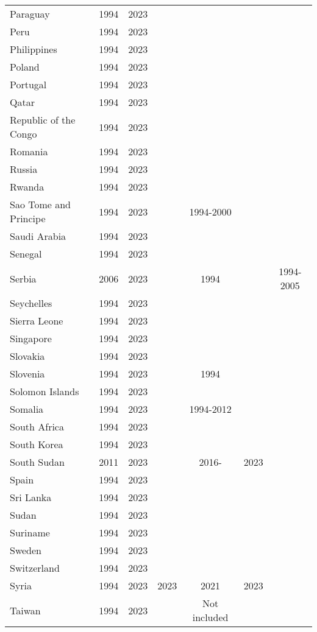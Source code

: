 {\begin{longtable}{lcccccc}
Paraguay & 1994 & 2023 &  &  &  & \\
\addlinespace
Peru & 1994 & 2023 &  &  &  & \\
Philippines & 1994 & 2023 &  &  &  & \\
Poland & 1994 & 2023 &  &  &  & \\
Portugal & 1994 & 2023 &  &  &  & \\
Qatar & 1994 & 2023 &  &  &  & \\
\addlinespace
Republic of the Congo & 1994 & 2023 &  &  &  & \\
Romania & 1994 & 2023 &  &  &  & \\
Russia & 1994 & 2023 &  &  &  & \\
Rwanda & 1994 & 2023 &  &  &  & \\
Sao Tome and Principe & 1994 & 2023 &  & 1994-2000 &  & \\
\addlinespace
Saudi Arabia & 1994 & 2023 &  &  &  & \\
Senegal & 1994 & 2023 &  &  &  & \\
Serbia & 2006 & 2023 &  & 1994 &  & 1994-2005\\
Seychelles & 1994 & 2023 &  &  &  & \\
Sierra Leone & 1994 & 2023 &  &  &  & \\
\addlinespace
Singapore & 1994 & 2023 &  &  &  & \\
Slovakia & 1994 & 2023 &  &  &  & \\
Slovenia & 1994 & 2023 &  & 1994 &  & \\
Solomon Islands & 1994 & 2023 &  &  &  & \\
Somalia & 1994 & 2023 &  & 1994-2012 &  & \\
\addlinespace
South Africa & 1994 & 2023 &  &  &  & \\
South Korea & 1994 & 2023 &  &  &  & \\
South Sudan & 2011 & 2023 &  & 2016- & 2023 & \\
Spain & 1994 & 2023 &  &  &  & \\
Sri Lanka & 1994 & 2023 &  &  &  & \\
\addlinespace
Sudan & 1994 & 2023 &  &  &  & \\
Suriname & 1994 & 2023 &  &  &  & \\
Sweden & 1994 & 2023 &  &  &  & \\
Switzerland & 1994 & 2023 &  &  &  & \\
Syria & 1994 & 2023 & 2023 & 2021 & 2023 & \\
\addlinespace
Taiwan & 1994 & 2023 &  & Not included &  & \\

\end{longtable}}
